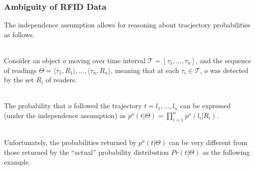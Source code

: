 \begin{frame}
\begin{columns}
\end{columns}

\end{frame}


\begin{frame}
\frametitle{Ambiguity of RFID Data}

The independence assumption allows for reasoning about tracjectory probabilities as follows.\\~\\
\pause

Consider an object $o$ moving over time interval $\mathcal{T} = [\tau_1,...,\tau_n]$, and the sequence of readings $\Theta = \langle \tau_1, R_1 \rangle, ..., \langle \tau_n, R_n \rangle$, meaning that at each $\tau_i \in \mathcal{T}$, $o$ was detected by the set $R_i$ of readers.\\~\\
\pause

The probability that $o$ followed the trajectory $t = l_1, ..., l_n$ can be expressed (under the independence assumption) as $p^a(t|\Theta) = \prod_{i=1}^n p^a(l_i|R_i)$.\\~\\
\pause

Unfortunately, the probabilities returned by $p^a(t|\Theta)$ can be very different from those returned by the ``actual'' probability distribution $Pr(t|\Theta)$ as the following example.

\end{frame}


